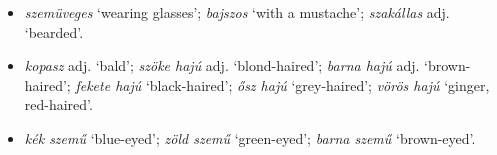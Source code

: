 \documentclass[a4paper,11pt]{article}
\begin{document}
\begin{itemize}
  \item \emph{szemüveges} `wearing glasses'; \emph{bajszos} `with a
    mustache'; \emph{szakállas} adj. `bearded'.

  \item \emph{kopasz} adj.  `bald'; \emph{szöke hajú}
    adj. `blond-haired'; \emph{barna hajú} adj. `brown\hyp{}haired';
    \emph{fekete hajú} `black\hyp{}haired'; \emph{ősz hajú}
    `grey\hyp{}haired'; \emph{vörös hajú} `ginger, red\hyp{}haired'.

   \item \emph{kék szemű} `blue\hyp{}eyed'; \emph{zöld szemű}
     `green\hyp{}eyed'; \emph{barna szemű} `brown\hyp{}eyed'.

\end{itemize}
\end{document}
